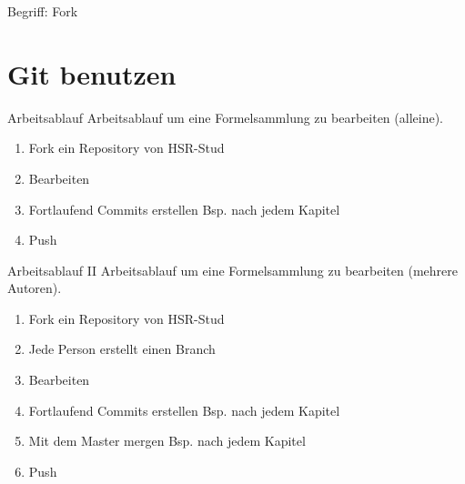\begin{frame}[c, plain]{Begriff: Fork}
\begin{center}
{}
\end{center}
\end{frame}

\section{Git benutzen}

\begin{frame}{Arbeitsablauf}
	Arbeitsablauf um eine Formelsammlung zu bearbeiten (alleine).
	\begin{enumerate}
		\item Fork ein Repository von HSR-Stud \pause
		\item Bearbeiten \pause
		\item Fortlaufend Commits erstellen Bsp. nach jedem Kapitel \pause
		\item Push
	\end{enumerate}
\end{frame}

\begin{frame}{Arbeitsablauf II}
Arbeitsablauf um eine Formelsammlung zu bearbeiten (mehrere Autoren).
\begin{enumerate}
	\item Fork ein Repository von HSR-Stud  \pause
	\item Jede Person erstellt einen Branch \pause
	\item Bearbeiten \pause
	\item Fortlaufend Commits erstellen Bsp. nach jedem Kapitel \pause
	\item Mit dem Master mergen Bsp. nach jedem Kapitel \pause
	\item Push
\end{enumerate}
\end{frame}
